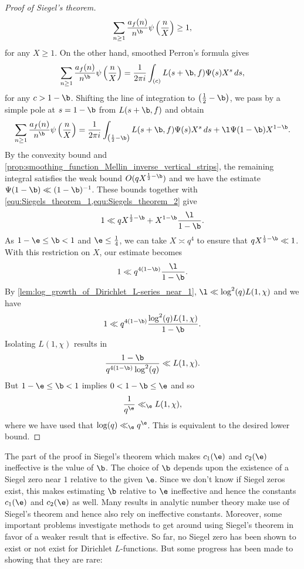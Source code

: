 \begin{proof}[Proof of Siegel's theorem]
      \begin{equation}\label{equ:Siegels_theorem_1}
        \sum_{n \ge 1}\frac{a_{f}(n)}{n^{\b}}\psi\left(\frac{n}{X}\right) \ge 1,
      \end{equation}
      for any \(X \ge 1\). On the other hand, smoothed Perron's formula gives
      \[
        \sum_{n \ge 1}\frac{a_{f}(n)}{n^{\b}}\psi\left(\frac{n}{X}\right) = \frac{1}{2\pi i}\int_{(c)}L(s+\b,f)\Psi(s)X^{s}\,ds,
      \]
      for any \(c > 1-\b\). Shifting the line of integration to \(\left(\frac{1}{2}-\b\right)\), we pass by a simple pole at \(s = 1-\b\) from \(L(s+\b,f)\) and obtain
      \begin{equation}\label{equ:Siegels_theorem_2}
        \sum_{n \ge 1}\frac{a_{f}(n)}{n^{\b}}\psi\left(\frac{n}{X}\right) = \frac{1}{2\pi i}\int_{\left(\frac{1}{2}-\b\right)}L(s+\b,f)\Psi(s)X^{s}\,ds+\l\Psi(1-\b)X^{1-\b}.
      \end{equation}
      By the convexity bound and \cref{prop:smoothing_function_Mellin_inverse_vertical_strips}, the remaining integral satisfies the weak bound \(O(qX^{\frac{1}{2}-\b})\) and we have the estimate \(\Psi(1-\b) \ll (1-\b)^{-1}\). These bounds together with \cref{equ:Siegels_theorem_1,equ:Siegels_theorem_2} give
      \[
        1 \ll qX^{\frac{1}{2}-\b}+X^{1-\b}\frac{\l}{1-\b}.
      \]
      As \(1-\e \le \b < 1\) and \(\e \le \frac{1}{4}\), we can take \(X \asymp q^{4}\) to ensure that \(qX^{\frac{1}{2}-\b} \ll 1\). With this restriction on \(X\), our estimate becomes
      \[
        1 \ll q^{4(1-\b)}\frac{\l}{1-\b}.
      \]
      By \cref{lem:log_growth_of_Dirichlet_L-series_near_1}, \(\l \ll \log^{2}(q)L(1,\chi)\) and we have
      \[
        1 \ll q^{4(1-\b)}\frac{\log^{2}(q)L(1,\chi)}{1-\b}.
      \]
      Isolating \(L(1,\chi)\) results in
      \[
        \frac{1-\b}{q^{4(1-\b)}\log^{2}(q)} \ll L(1,\chi).
      \]
      But \(1-\e \le \b < 1\) implies \(0< 1-\b \le \e\) and so
      \[
        \frac{1}{q^{\e}} \ll_{\e} L(1,\chi),
      \]
      where we have used that \(\log(q) \ll_{\e} q^{\e}\). This is equivalent to the desired lower bound.
    \end{proof}

    The part of the proof in Siegel's theorem which makes \(c_{1}(\e)\) and \(c_{2}(\e)\) ineffective is the value of \(\b\). The choice of \(\b\) depends upon the existence of a Siegel zero near \(1\) relative to the given \(\e\). Since we don't know if Siegel zeros exist, this makes estimating \(\b\) relative to \(\e\) ineffective and hence the constants \(c_{1}(\e)\) and \(c_{2}(\e)\) as well. Many results in analytic number theory make use of Siegel's theorem and hence also rely on ineffective constants. Moreover, some important problems investigate methods to get around using Siegel's theorem in favor of a weaker result that is effective. So far, no Siegel zero has been shown to exist or not exist for Dirichlet \(L\)-functions. But some progress has been made to showing that they are rare:

